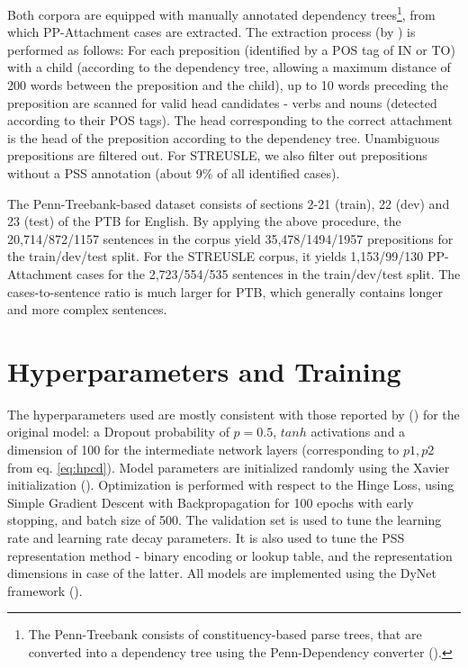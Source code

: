 Both corpora are equipped with manually annotated dependency trees\footnote{The Penn-Treebank consists of constituency-based parse trees, that are converted into a dependency tree using the Penn-Dependency converter (\cite{johansson07extended}).}, from which PP-Attachment cases are extracted. The extraction process (by \cite{hpcd}) is performed as follows: For each preposition (identified by a POS tag of IN or TO) with a child (according to the dependency tree, allowing a maximum distance of 200 words between the preposition and the child), up to 10 words preceding the preposition are scanned for valid head candidates - verbs and nouns (detected according to their POS tags). The head corresponding to the correct attachment is the head of the preposition according to the dependency tree. Unambiguous prepositions are filtered out. For STREUSLE, we also filter out prepositions without a PSS annotation (about 9\% of all identified cases).

The Penn-Treebank-based dataset consists of sections 2-21 (train), 22 (dev) and 23 (test) of the PTB for English. By applying the above procedure, the 20,714/872/1157 sentences in the corpus yield 35,478/1494/1957 prepositions for the train/dev/test split. For the STREUSLE corpus, it yields 1,153/99/130 PP-Attachment cases for the 2,723/554/535 sentences in the train/dev/test split. The cases-to-sentence ratio is much larger for PTB, which generally contains longer and more complex sentences. 
    
\section{Hyperparameters and Training}

The hyperparameters used are mostly consistent with those reported by (\cite{hpcd}) for the original model: a Dropout probability of $p = 0.5$, $tanh$ activations and a dimension of 100 for the intermediate network layers (corresponding to $p1, p2$ from eq. \ref{eq:hpcd}). Model parameters are initialized randomly using the Xavier initialization (\cite{glorot10xavier}). Optimization is performed with respect to the Hinge Loss, using Simple Gradient Descent with Backpropagation for 100 epochs with early stopping, and batch size of 500. The validation set is used to tune the learning rate and learning rate decay parameters. It is also used to tune the PSS representation method - binary encoding or lookup table, and the representation dimensions in case of the latter. All models are implemented using the DyNet framework (\cite{dynet}). 

